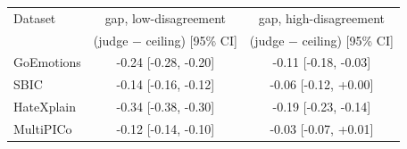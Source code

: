 \begin{tabular}{@{}l c c@{}}
\toprule
Dataset & gap, low-disagreement & gap, high-disagreement \\
 & (judge $-$ ceiling) [95\% CI] & (judge $-$ ceiling) [95\% CI] \\
\midrule
GoEmotions & -0.24 [-0.28, -0.20] & -0.11 [-0.18, -0.03] \\
SBIC & -0.14 [-0.16, -0.12] & -0.06 [-0.12, +0.00] \\
HateXplain & -0.34 [-0.38, -0.30] & -0.19 [-0.23, -0.14] \\
MultiPICo & -0.12 [-0.14, -0.10] & -0.03 [-0.07, +0.01] \\
\bottomrule
\end{tabular}